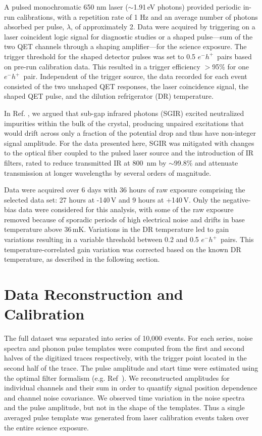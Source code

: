 \documentclass[%
reprint,
superscriptaddress,
preprintnumbers,
amsmath,amssymb,
prl,
aps,
floatfix
]{revtex4-1}
\newcommand{\eh}{$e^-h^+$}
\begin{document}
A pulsed monochromatic 650 nm laser ($\sim$1.91\,eV photons) provided periodic in-run calibrations, with a repetition rate of 1 Hz and an average number of photons absorbed per pulse, $\lambda$, of approximately 2. Data were acquired by triggering on a laser coincident logic signal for diagnostic studies or a shaped pulse---sum of the two QET channels through a shaping amplifier---for the science exposure. The trigger threshold for the shaped detector pulses was set to 0.5 \eh\ pairs based on pre-run calibration data. This resulted in a trigger efficiency $>$95\% for one \eh\ pair. Independent of the trigger source, the data recorded for each event consisted of the two unshaped QET responses, the laser coincidence signal, the shaped QET pulse, and the dilution refrigerator (DR) temperature.

In Ref. \cite{Romani}, we argued that sub-gap infrared photons (SGIR) excited neutralized impurities within the bulk of the crystal, producing unpaired excitations that would drift across only a fraction of the potential drop and thus have non-integer signal amplitude. For the data presented here, SGIR was mitigated with changes to the optical fiber coupled to the pulsed laser source and the introduction of IR filters, rated to reduce transmitted IR at 800~nm by $\sim$99.8\% and attenuate transmission at longer wavelengths by several orders of magnitude.

Data were acquired over 6 days with 36 hours of raw exposure comprising the selected data set: 27 hours at -140\,V and 9 hours at +140\,V. Only the negative-bias data were considered for this analysis, with some of the raw exposure removed because of sporadic periods of high electrical noise and drifts in base temperature above 36\,mK. Variations in the DR temperature led to gain variations resulting in a variable threshold between 0.2 and 0.5 \eh\ pairs. This temperature-correlated gain variation was corrected based on the known DR temperature, as described in the following section.

\section{Data Reconstruction and Calibration}
The full dataset was separated into series of 10,000 events. For each series, noise spectra and phonon pulse templates were computed from the first and second halves of the digitized traces respectively, with the trigger point located in the second half of the trace. The pulse amplitude and start time were estimated using the optimal filter formalism (e.g. Ref~\cite{Golwala}). We reconstructed amplitudes for individual channels and their sum in order to quantify signal position dependence and channel noise covariance. We observed time variation in the noise spectra and the pulse amplitude, but not in the shape of the templates. Thus a single averaged pulse template was generated from laser calibration events taken over the entire science exposure.
\end{document}
